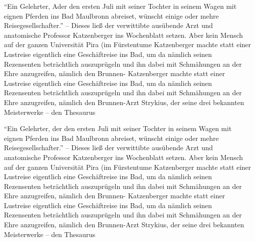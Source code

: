\documentclass[11pt]{book}
\begin{document}
\begin{pages}
\begin{Leftside}
\beginnumbering
\pstart
``Ein Gelehrter, Ader den ersten Juli mit seiner Tochter in seinem Wagen mit eignen Pferden ins Bad Maulbronn abreiset, wünscht einige oder mehre Reisegesellschafter.'' -- Dieses ließ der verwittibte ausübende Arzt und anatomische Professor Katzenberger ins Wochenblatt setzen. Aber kein Mensch auf der ganzen Universität Pira (im Fürstentume
\pend
\pstart
Katzenberger machte statt einer Lustreise eigentlich eine Geschäftreise ins Bad, um da nämlich seinen Rezensenten beträchtlich auszuprügeln und ihn dabei mit Schmähungen an der Ehre anzugreifen, nämlich den Brunnen-\pend
\pstart
Katzenberger machte statt einer Lustreise eigentlich eine Geschäftreise ins Bad, um da nämlich seinen Rezensenten beträchtlich auszuprügeln und ihn dabei mit Schmähungen an der Ehre anzugreifen, nämlich den Brunnen-Arzt Strykius, der seine drei bekannten Meisterwerke -- den Thesaurus \pend
\endnumbering
\end{Leftside}
\begin{Rightside}
\beginnumbering
\pstart
``Ein Gelehrter, der den ersten Juli mit seiner Tochter in seinem Wagen mit eignen Pferden ins Bad Maulbronn abreiset, wünscht einige oder mehre Reisegesellschafter.'' -- Dieses ließ der verwittibte ausübende Arzt und anatomische Professor Katzenberger ins Wochenblatt setzen. Aber kein Mensch auf der ganzen Universität Pira (im Fürstentume
\pend
\pstart
Katzenberger machte statt einer Lustreise eigentlich eine Geschäftreise ins Bad, um da nämlich seinen Rezensenten beträchtlich auszuprügeln und ihn dabei mit Schmähungen an der Ehre anzugreifen, nämlich den Brunnen-\pend
\pstart
Katzenberger machte statt einer Lustreise eigentlich eine Geschäftreise ins Bad, um da nämlich seinen Rezensenten beträchtlich auszuprügeln und ihn dabei mit Schmähungen an der Ehre anzugreifen, nämlich den Brunnen-Arzt Strykius, der seine drei bekannten Meisterwerke -- den Thesaurus \pend
\endnumbering
\end{Rightside}
\Pages
\end{pages}
\end{document}
